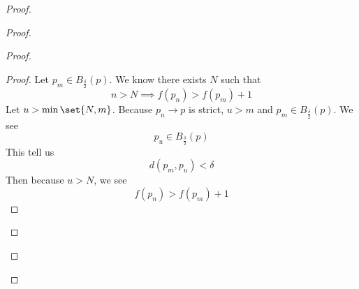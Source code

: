 \documentclass{report}
\begin{document}
\begin{proof}
\begin{proof}
\begin{proof}
\begin{proof}
Let $p_m \in  B_{\frac{\delta}{2}}(p)$. We know there exists $N$ such that 
\begin{equation*}
n>N \implies f(p_n)>f(p_m)+1
\end{equation*}
Let $u>\min \set{N,m}$. Because $p_n \to p$ is strict, $u>m$ and $p_m \in B_{\frac{\delta}{2}}(p)$. We see 
\begin{equation*}
p_u\in B_{\frac{\delta}{2}}(p)
\end{equation*}
This tell us 
\begin{equation*}
d(p_m,p_u)<\delta
\end{equation*}
Then because $u>N$, we see 
 \begin{equation*}
f(p_n)>f(p_m)+1
\end{equation*}
\end{proof}


\end{proof}
\end{proof}
\end{proof}
\end{document}
